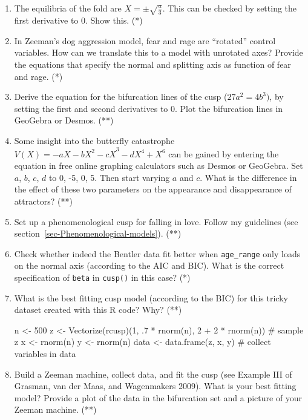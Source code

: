 \documentclass[
  a4paper,
  DIV=11,
  numbers=noendperiod,
  oneside]{scrreprt}
\newenvironment{Shaded}{}{}
\newcommand{\CommentTok}[1]{\textcolor[rgb]{0.42,0.45,0.49}{#1}}
\newcommand{\DecValTok}[1]{\textcolor[rgb]{0.00,0.36,0.77}{#1}}
\newcommand{\FunctionTok}[1]{\textcolor[rgb]{0.44,0.26,0.76}{#1}}
\newcommand{\NormalTok}[1]{\textcolor[rgb]{0.14,0.16,0.18}{#1}}
\newcommand{\OtherTok}[1]{\textcolor[rgb]{0.44,0.26,0.76}{#1}}
\newcommand{\SpecialCharTok}[1]{\textcolor[rgb]{0.00,0.36,0.77}{#1}}
\begin{document}
\begin{enumerate}
\def\labelenumi{\arabic{enumi})}
\item
  The equilibria of the fold are \(X = \pm \sqrt{\frac{a}{3}}\). This
  can be checked by setting the first derivative to 0. Show this. (*)
\item
  In Zeeman's dog aggression model, fear and rage are ``rotated''
  control variables. How can we translate this to a model with unrotated
  axes? Provide the equations that specify the normal and splitting axis
  as function of fear and rage. (*)
\item
  Derive the equation for the bifurcation lines of the cusp
  (\(27a^{2} = 4b^{3})\), by setting the first and second derivatives to
  0. Plot the bifurcation lines in GeoGebra or Desmos. (**)
\item
  Some insight into the butterfly catastrophe
  \(V(X) = {- aX - bX^{2} - cX}^{3} - dX^{4} + X^{6}\) can be gained by
  entering the equation in free online graphing calculators such as
  Desmos or GeoGebra. Set \(a\), \(b\), \(c\), \(d\) to 0, -5, 0, 5.
  Then start varying \(a\) and \(c\). What is the difference in the
  effect of these two parameters on the appearance and disappearance of
  attractors? (**)
\item
  Set up a phenomenological cusp for falling in love. Follow my
  guidelines (see section~\ref{sec-Phenomenological-models}). (**)
\item
  Check whether indeed the Bentler data fit better when
  \texttt{age\_range} only loads on the normal axis (according to the
  AIC and BIC). What is the correct specification of \texttt{beta} in
  \texttt{cusp()} in this case? (*)
\item
  What is the best fitting cusp model (according to the BIC) for this
  tricky dataset created with this R code? Why? (**)

\begin{Shaded}
\begin{Highlighting}[]
\NormalTok{n }\OtherTok{\textless{}{-}} \DecValTok{500}
\NormalTok{z }\OtherTok{\textless{}{-}} \FunctionTok{Vectorize}\NormalTok{(rcusp)(}\DecValTok{1}\NormalTok{, .}\DecValTok{7} \SpecialCharTok{*} \FunctionTok{rnorm}\NormalTok{(n), }\DecValTok{2} \SpecialCharTok{+} \DecValTok{2} \SpecialCharTok{*} \FunctionTok{rnorm}\NormalTok{(n)) }\CommentTok{\# sample z }
\NormalTok{x }\OtherTok{\textless{}{-}} \FunctionTok{rnorm}\NormalTok{(n) }
\NormalTok{y }\OtherTok{\textless{}{-}} \FunctionTok{rnorm}\NormalTok{(n) }
\NormalTok{data }\OtherTok{\textless{}{-}} \FunctionTok{data.frame}\NormalTok{(z, x, y) }\CommentTok{\# collect variables in data}
\end{Highlighting}
\end{Shaded}
\item
  Build a Zeeman machine, collect data, and fit the cusp (see Example
  III of Grasman, van der Maas, and Wagenmakers 2009). What is your best
  fitting model? Provide a plot of the data in the bifurcation set and a
  picture of your Zeeman machine. (**)
\end{enumerate}
\end{document}
